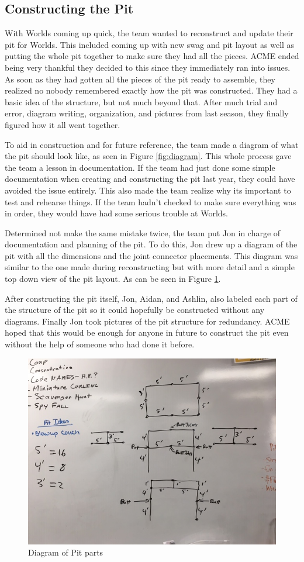 \documentclass{article}
\begin{document}
\subsection{Constructing the Pit}
With Worlds coming up quick, the team wanted to reconstruct and update their pit for Worlds. This included coming up with new swag and pit layout as well as putting the whole pit together to make sure they had all the pieces. ACME ended being very thankful they decided to this since they immediately ran into issues. As soon as they had gotten all the pieces of the pit ready to assemble, they realized no nobody remembered exactly how the pit was constructed. They had a basic idea of the structure, but not much beyond that. After much trial and error, diagram writing, organization, and pictures from last season, they finally figured how it all went together. 

To aid in construction and for future reference, the team made a diagram of what the pit should look like, as seen in Figure \ref{fig:diagram}. This whole process gave the team a lesson in documentation. If the team had just done some simple documentation when creating and constructing the pit last year, they could have avoided the issue entirely. This also made the team realize why its important to test and rehearse things. If the team hadn't checked to make sure everything was in order, they would have had some serious trouble at Worlds. 

Determined not make the same mistake twice, the team put Jon in charge of documentation and planning of the pit. To do this, Jon drew up a diagram of the pit with all the dimensions and the joint connector placements. This diagram was similar to the one made during reconstructing but with more detail and a simple top down view of the pit layout. As can be seen in Figure \ref{fig:pitone}. 

After constructing the pit itself, Jon, Aidan, and Ashlin, also labeled each part of the structure of the pit so it could hopefully be constructed without any diagrams. Finally Jon took pictures of the pit structure for redundancy. ACME hoped that this would be enough for anyone in future to construct the pit even without the help of someone who had done it before.

\begin{figure}
    \centering
    \includegraphics[width= 0.5 \textwidth]{30_03-25/images/pitdiagram1.JPG}
    \caption{Diagram of Pit parts}
    \label{fig:pitone}
\end{figure}
\end{document}
